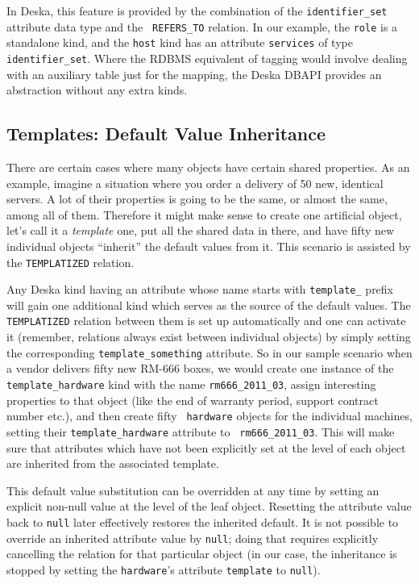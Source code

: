 \documentclass[deska]{subfiles}
\begin{document}
In Deska, this feature is provided by the combination of the {\tt identifier\_set} attribute data type and the {\tt
REFERS\_TO} relation.  In our example, the {\tt role} is a standalone kind, and the {\tt host} kind has an attribute
{\tt services} of type {\tt identifier\_set}.  Where the RDBMS equivalent of tagging would involve dealing with an
auxiliary table just for the mapping, the Deska DBAPI provides an abstraction without any extra kinds.

\subsection{Templates: Default Value Inheritance}

There are certain cases where many objects have certain shared properties.  As an example, imagine a situation where you
order a delivery of 50 new, identical servers.  A lot of their properties is going to be the same, or almost the same,
among all of them.  Therefore it might make sense to create one artificial object, let's call it a {\em template} one,
put all the shared data in there, and have fifty new individual objects ``inherit'' the default values from it.  This
scenario is assisted by the {\tt TEMPLATIZED} relation.

Any Deska kind having an attribute whose name starts with {\tt template\_} prefix will gain one additional kind which
serves as the source of the default values.  The {\tt TEMPLATIZED} relation between them is set up automatically and one
can activate it (remember, relations always exist between individual objects) by simply setting the corresponding
{\tt template\_something} attribute.  So in our sample scenario when a vendor delivers fifty new RM-666 boxes, we would
create one instance of the {\tt template\_hardware} kind with the name {\tt rm666\_2011\_03}, assign interesting
properties to that object (like the end of warranty period, support contract number etc.), and then create fifty {\tt
hardware} objects for the individual machines, setting their {\tt template\_hardware} attribute to {\tt
rm666\_2011\_03}.  This will make sure that attributes which have not been explicitly set at the level of each object
are inherited from the associated template.

This default value substitution can be overridden at any time by setting an explicit non-null value at the level of the
leaf object.  Resetting the attribute value back to {\tt null} later effectively restores the inherited default.  It is
not possible to override an inherited attribute value by {\tt null}; doing that requires explicitly cancelling the
relation for that particular object (in our case, the inheritance is stopped by setting the {\tt hardware}'s attribute
{\tt template} to {\tt null}).
\end{document}
